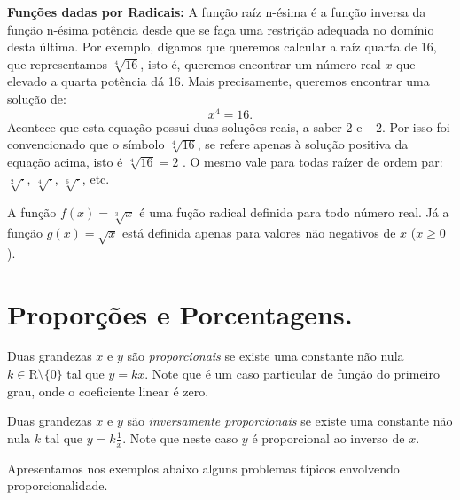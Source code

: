 \noindent\textbf{Funções dadas por Radicais:}  A função raíz n-ésima é a função inversa da função n-ésima potência desde que
se faça  uma restrição adequada no domínio desta última. Por exemplo, digamos que queremos calcular a raíz quarta de
16, que representamos $\sqrt[4]{16}$, isto é, queremos encontrar um número real $x$ que elevado a quarta potência
dá 16. Mais precisamente, queremos encontrar uma solução de:
$$x^4=16.$$
Acontece que esta equação possui duas soluções reais, a saber $2$ e $-2$. Por isso foi convencionado que o símbolo
$\sqrt[4]{16}$, se refere apenas à solução positiva da equação acima, isto é $\sqrt[4]{16}=2$ .
O mesmo vale para todas raízer de ordem par: $\sqrt[2]{\cdot }$, $\sqrt[4]{\cdot}$, $\sqrt[6]{\cdot}$, etc.
\begin{center}
\begin{minipage}{16cm}
\end{minipage}
\end{center}
\begin{exemplo} A função $f(x)=\sqrt[3]{x}$ é uma fução radical definida para todo número real. Já a função $g(x)= \sqrt{x}$
está definida apenas para valores não negativos de $x$ ($x\geq 0$).
\end{exemplo}


\section{Proporções e Porcentagens.}

Duas grandezas $x$ e $y$ são \textit{proporcionais} se existe uma constante não nula $k\in \mbox{R}\setminus \{0\}$ tal que $y=kx$. Note que é um caso particular de função do primeiro grau, onde o coeficiente linear é zero.

Duas grandezas $x$ e $y$ são \textit{inversamente proporcionais} se existe uma constante não nula $k$ tal que $y=k\frac{1}{x}$. Note que neste caso $y$ é proporcional ao inverso de $x$.

Apresentamos nos exemplos abaixo alguns problemas típicos envolvendo proporcionalidade.

